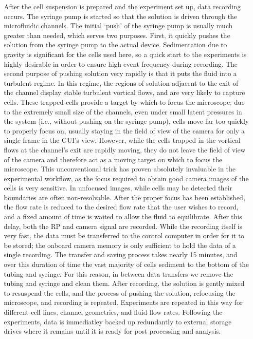 			After the cell suspension is prepared and the experiment set up, data recording occurs. The syringe pump is started so that the solution is driven through the microfluidic channels. The initial `push' of the syringe pump is usually much greater than needed, which serves two purposes. First, it quickly pushes the solution from the syringe pump to the actual device. Sedimentation due to gravity is significant for the cells used here, so a quick start to the experiments is highly desirable in order to ensure high event frequency during recording. The second purpose of pushing solution very rapidly is that it puts the fluid into a turbulent regime. In this regime, the regions of solution adjacent to the exit of the channel display stable turbulent vortical flows, and are very likely to capture cells. These trapped cells provide a target by which to focus the microscope; due to the extremely small size of the channels, even under small latent pressures in the system (i.e., without pushing on the syringe pump), cells move far too quickly to properly focus on, usually staying in the field of view of the camera for only a single frame in the GUI's view. However, while the cells trapped in the vortical flows at the channel's exit are rapidly moving, they do not leave the field of view of the camera and therefore act as a moving target on which to focus the microscope. This unconventional trick has proven absolutely invaluable in the experimental workflow, as the focus required to obtain good camera images of the cells is very sensitive. In unfocused images, while cells may be detected their boundaries are often non-resolvable. After the proper focus has been established, the flow rate is reduced to the desired flow rate that the user wishes to record, and a fixed amount of time is waited to allow the fluid to equilibrate. After this delay, both the RP and camera signal are recorded. While the recording itself is very fast, the data must be transferred to the control computer in order for it to be stored; the onboard camera memory is only sufficient to hold the data of a single recording. The transfer and saving process takes nearly 15 minutes, and over this duration of time the vast majority of cells sediment to the bottom of the tubing and syringe. For this reason, in between data transfers we remove the tubing and syringe and clean them. After recording, the solution is gently mixed to resuspend the cells, and the process of pushing the solution, refocusing the microscope, and recording is repeated. Experiments are repeated in this way for different cell lines, channel geometries, and fluid flow rates. Following the experiments, data is immediatley backed up redundantly to external storage drives where it remains until it is ready for post processing and analysis.
		
